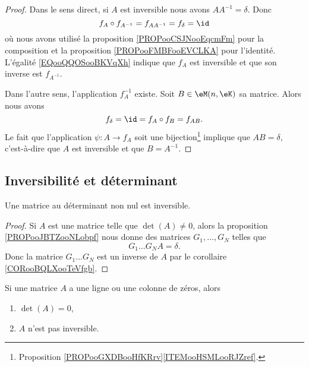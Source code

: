 \begin{proof}
    Dans le sens direct, si \( A\) est inversible nous avons \( AA^{-1}=\delta\). Donc
    \begin{equation}        \label{EQooQQOSooBKVqXh}
        f_A\circ f_{A^{-1}}=f_{AA^{-1}}=f_{\delta}=\id
    \end{equation}
    où nous avons utilisé la proposition \ref{PROPooCSJNooEqcmFm} pour la composition et la proposition \ref{PROPooFMBFooEVCLKA} pour l'identité. L'égalité \eqref{EQooQQOSooBKVqXh} indique que \( f_A\) est inversible et que son inverse est \( f_{A^{-1}}\).

    Dans l'autre sens, l'application \( f_A^{-1}\) existe. Soit \( B\in \eM(n,\eK)\) sa matrice. Alors nous avons
    \begin{equation}
        f_{\delta}=\id=f_A\circ f_B=f_{AB}.
    \end{equation}
    Le fait que l'application \(\psi\colon A\to f_A\) soit une bijection\footnote{Proposition \ref{PROPooGXDBooHfKRrv}\ref{ITEMooHSMLooRJZref}.} implique que \( AB=\delta\), c'est-à-dire que \( A\) est inversible et que \( B=A^{-1}\).
\end{proof}

\subsection{Inversibilité et déterminant}

\begin{proposition}     \label{PROPooAVIXooMtVCet}
    Une matrice au déterminant non nul est inversible.
\end{proposition}

\begin{proof}
    Si \( A\) est une matrice telle que \( \det(A)\neq 0\), alors la proposition \ref{PROPooJBTZooNLobpf} nous donne des matrices \( G_1,\ldots, G_N\) telles que
    \begin{equation}
        G_1\ldots G_NA=\delta.
    \end{equation}
    Donc la matrice \( G_1\ldots G_N\) est un inverse de \( A\) par le corollaire \ref{CORooBQLXooTeVfgb}.
\end{proof}

\begin{proposition}     \label{PROPooEOKBooKUROFg}
    Si une matrice \( A\) a une ligne ou une colonne de zéros, alors
    \begin{enumerate}
        \item
            \( \det(A)=0\),
        \item
            \( A\) n'est pas inversible.
    \end{enumerate}
\end{proposition}


